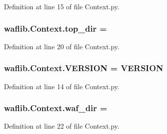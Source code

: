 Definition at line 15 of file Context.\+py.

\subsubsection[{\texorpdfstring{top\+\_\+dir}{top_dir}}]{ waflib.\+Context.\+top\+\_\+dir = \textquotesingle{}\textquotesingle{}}\hypertarget{namespacewaflib_1_1_context_a58935e55304cd0922f2d486af1a0e819}{}\label{namespacewaflib_1_1_context_a58935e55304cd0922f2d486af1a0e819}


Definition at line 20 of file Context.\+py.

\subsubsection[{\texorpdfstring{V\+E\+R\+S\+I\+ON}{VERSION}}]{ waflib.\+Context.\+V\+E\+R\+S\+I\+ON = \textquotesingle{}V\+E\+R\+S\+I\+ON\textquotesingle{}}\hypertarget{namespacewaflib_1_1_context_a85bd1688f8aed8220d72caa9d0b9c25a}{}\label{namespacewaflib_1_1_context_a85bd1688f8aed8220d72caa9d0b9c25a}


Definition at line 14 of file Context.\+py.

\subsubsection[{\texorpdfstring{waf\+\_\+dir}{waf_dir}}]{ waflib.\+Context.\+waf\+\_\+dir = \textquotesingle{}\textquotesingle{}}\hypertarget{namespacewaflib_1_1_context_a2960ec8049264f2fbb6c3fd8917aab90}{}\label{namespacewaflib_1_1_context_a2960ec8049264f2fbb6c3fd8917aab90}


Definition at line 22 of file Context.\+py.

